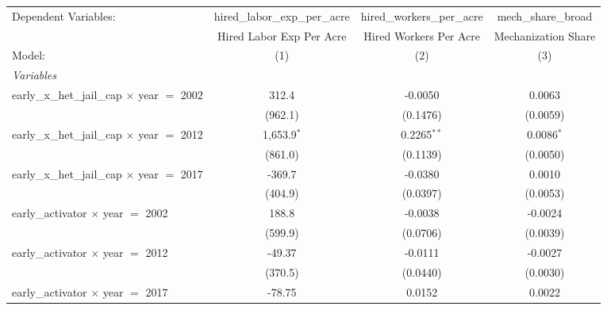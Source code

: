 
\begingroup
\centering
\begin{tabular}{lccc}
   \tabularnewline \midrule \midrule
   Dependent Variables:                                 & hired\_labor\_exp\_per\_acre     & hired\_workers\_per\_acre    & mech\_share\_broad\\    
                                                        & Hired Labor Exp Per Acre         & Hired Workers Per Acre       & Mechanization Share \\   
   Model:                                               & (1)                              & (2)                          & (3)\\  
   \midrule
   \emph{Variables}\\
   early\_x\_het\_jail\_cap $\times$ year $=$ 2002      & 312.4                            & -0.0050                      & 0.0063\\   
                                                        & (962.1)                          & (0.1476)                     & (0.0059)\\   
   early\_x\_het\_jail\_cap $\times$ year $=$ 2012      & 1,653.9$^{*}$                    & 0.2265$^{**}$                & 0.0086$^{*}$\\   
                                                        & (861.0)                          & (0.1139)                     & (0.0050)\\   
   early\_x\_het\_jail\_cap $\times$ year $=$ 2017      & -369.7                           & -0.0380                      & 0.0010\\   
                                                        & (404.9)                          & (0.0397)                     & (0.0053)\\   
   early\_activator $\times$ year $=$ 2002              & 188.8                            & -0.0038                      & -0.0024\\   
                                                        & (599.9)                          & (0.0706)                     & (0.0039)\\   
   early\_activator $\times$ year $=$ 2012              & -49.37                           & -0.0111                      & -0.0027\\   
                                                        & (370.5)                          & (0.0440)                     & (0.0030)\\   
   early\_activator $\times$ year $=$ 2017              & -78.75                           & 0.0152                       & 0.0022\\   

\end{tabular}
